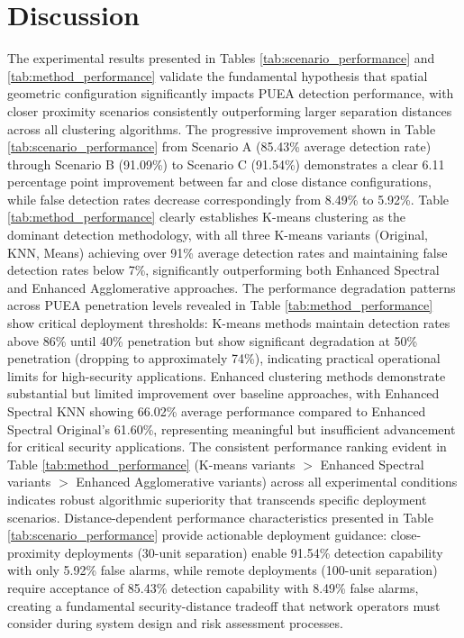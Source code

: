 \section{Discussion}

The experimental results presented in Tables \ref{tab:scenario_performance} and \ref{tab:method_performance} validate the fundamental hypothesis that spatial geometric configuration significantly impacts PUEA detection performance, with closer proximity scenarios consistently outperforming larger separation distances across all clustering algorithms. The progressive improvement shown in Table \ref{tab:scenario_performance} from Scenario A (85.43\% average detection rate) through Scenario B (91.09\%) to Scenario C (91.54\%) demonstrates a clear 6.11 percentage point improvement between far and close distance configurations, while false detection rates decrease correspondingly from 8.49\% to 5.92\%. Table \ref{tab:method_performance} clearly establishes K-means clustering as the dominant detection methodology, with all three K-means variants (Original, KNN, Means) achieving over 91\% average detection rates and maintaining false detection rates below 7\%, significantly outperforming both Enhanced Spectral and Enhanced Agglomerative approaches. The performance degradation patterns across PUEA penetration levels revealed in Table \ref{tab:method_performance} show critical deployment thresholds: K-means methods maintain detection rates above 86\% until 40\% penetration but show significant degradation at 50\% penetration (dropping to approximately 74\%), indicating practical operational limits for high-security applications. Enhanced clustering methods demonstrate substantial but limited improvement over baseline approaches, with Enhanced Spectral KNN showing 66.02\% average performance compared to Enhanced Spectral Original's 61.60\%, representing meaningful but insufficient advancement for critical security applications. The consistent performance ranking evident in Table \ref{tab:method_performance} (K-means variants $>$ Enhanced Spectral variants $>$ Enhanced Agglomerative variants) across all experimental conditions indicates robust algorithmic superiority that transcends specific deployment scenarios. Distance-dependent performance characteristics presented in Table \ref{tab:scenario_performance} provide actionable deployment guidance: close-proximity deployments (30-unit separation) enable 91.54\% detection capability with only 5.92\% false alarms, while remote deployments (100-unit separation) require acceptance of 85.43\% detection capability with 8.49\% false alarms, creating a fundamental security-distance tradeoff that network operators must consider during system design and risk assessment processes.

